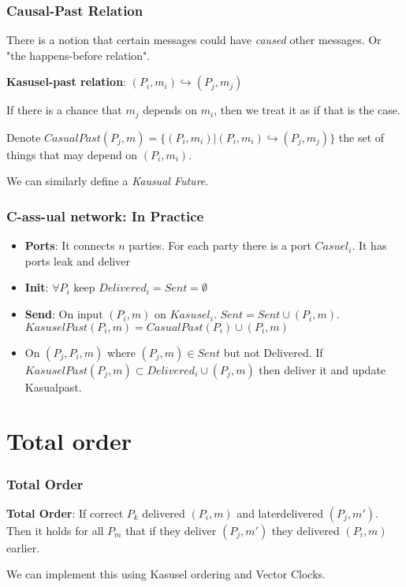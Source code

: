     \begin{frame}
        \frametitle{Causal-Past Relation}
            There is a notion that certain messages could have \textit{caused} other messages. Or "the happens-before relation". 

            \textbf{Kasusel-past relation}: $(P_i, m_i) \hookrightarrow (P_j, m_j)$
        
            If there is a chance that $m_j$ depends on $m_i$, then we treat it as if that is the case. 

            Denote $CasualPast(P_j, m) = \{(P_i, m_i) | (P_i, m_i) \hookrightarrow (P_j, m_j) \}$ the set of things that may depend on $(P_i, m_i)$. 

            We can similarly define a \textit{Kausual Future}. 
    \end{frame}

    \begin{frame}
        \frametitle{C-ass-ual network: In Practice}
            \begin{itemize}
                \item \textbf{Ports}: It connects $n$ parties. For each party there is a port $Casuel_i$. It has ports leak and deliver
                \item \textbf{Init}: $\forall P_i$ keep $Delivered_i = Sent = \emptyset$
                \item \textbf{Send}: On input $(P_i, m)$ on $Kasusel_i$. $Sent = Sent \cup (P_i, m)$. $KasuselPast(P_i, m) = CasualPast(P_i) \cup (P_i, m)$
                \item On $(P_j, P_i, m)$ where $(P_j, m) \in Sent$ but not Delivered. If $KasuselPast(P_j, m) \subset Delivered_i \cup (P_j, m)$ then deliver it and update Kasualpast. 
            \end{itemize}
    \end{frame}

\section{Total order}
    \begin{frame}
        \frametitle{Total Order}
            \textbf{Total Order}: If correct $P_k$ delivered $(P_i, m)$ and laterdelivered $(P_j, m')$. Then it holds for all $P_m$ that if they deliver $(P_j, m')$ they delivered $(P_i, m)$ earlier. 
        
            We can implement this using Kasusel ordering and Vector Clocks. 
    \end{frame}

